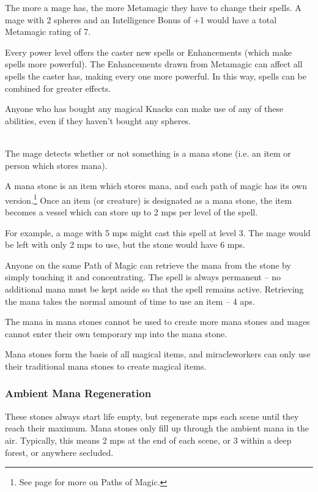 \begin{multicols}{2}


\noindent
The more  a mage has, the more Metamagic they have to change their spells.
A mage with 2 spheres and an Intelligence Bonus of +1 would have a total Metamagic rating of 7.

Every power level offers the caster new spells or Enhancements (which make spells more powerful).
The Enhancements drawn from Metamagic can affect all spells the caster has, making every one more powerful.
In this way, spells can be combined for greater effects.

Anyone who has bought any magical Knacks can make use of any of these abilities, even if they haven't bought any spheres.

\spelllevel

\\
The mage detects whether or not something is a mana stone (i.e. an item or person which stores mana).


A mana stone is an item which stores mana, and each path of magic has its own version.\footnote{See page \pageref{magic_paths} for more on Paths of Magic.}
Once an item (or creature) is designated as a mana stone, the item becomes a vessel which can store up to 2 \glspl{mp} per level of the spell.

For example, a mage with 5 \glspl{mp} might cast this spell at level 3.
The mage would be left with only 2 \glspl{mp} to use, but the stone would have 6 \glspl{mp}.

Anyone on the same Path of Magic can retrieve the mana from the stone by simply touching it and concentrating.
The spell is always permanent -- no additional mana must be kept aside so that the spell remains active.
Retrieving the mana takes the normal amount of time to use an item -- 4 \glspl{ap}.

The mana in mana stones cannot be used to create more mana stones and mages cannot enter their own temporary \gls{mp} into the mana stone.

Mana stones form the basis of all magical items, and \glspl{miracleworker} can only use their traditional mana stones to create magical items.

\subsubsection{Ambient Mana Regeneration}
\label{ambientmana}
These stones always start life empty, but regenerate \glspl{mp} each scene until they reach their maximum.
Mana stones only fill up through the ambient mana in the air.
Typically, this means 2 \glspl{mp} at the end of each scene, or 3 within a deep forest, or anywhere secluded.


\end{multicols}

